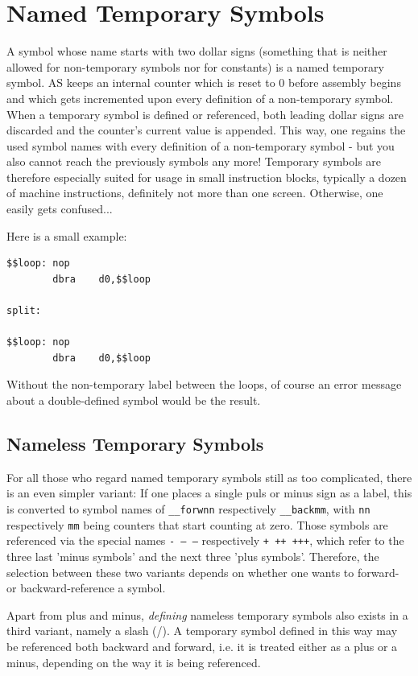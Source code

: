 \documentclass[12pt,twoside]{report}
\newcommand{\asname}{{AS}}
\begin{document}
\section{Named Temporary Symbols}

A symbol whose name starts with two dollar signs (something that is
neither allowed for non-temporary symbols nor for constants) is a named
temporary symbol.  \asname{} keeps an internal counter which is reset to 0 before
assembly begins and which gets incremented upon every definition of a
non-temporary symbol.  When a temporary symbol is defined or referenced,
both leading dollar signs are discarded and the counter's current value is
appended.  This way, one regains the used symbol names with every
definition of a non-temporary symbol - but you also cannot reach the
previously symbols any more! Temporary symbols are therefore especially
suited for usage in small instruction blocks, typically a dozen of machine
instructions, definitely not more than one screen.  Otherwise, one easily
gets confused...

Here is a small example:
\begin{verbatim}
$$loop: nop
        dbra    d0,$$loop

split:

$$loop: nop
        dbra    d0,$$loop
\end{verbatim}
Without the non-temporary label between the loops, of course an error
message about a double-defined symbol would be the result.

\subsection{Nameless Temporary Symbols}

For all those who regard named temporary symbols still as too complicated,
there is an even simpler variant: If one places a single puls or minus
sign as a label, this is converted to symbol names of {\tt \_\_forwnn}
respectively {\tt \_\_backmm}, with {\tt nn} respectively {\tt mm} being
counters that start counting at zero.  Those symbols are referenced via
the special names {\tt - -- ---} respectively {\tt + ++ +++}, which refer
to the three last 'minus symbols' and the next three 'plus symbols'.
Therefore, the selection between these two variants depends on whether one
wants to forward- or backward-reference a symbol.

Apart from plus and minus, {\em defining} nameless temporary symbols also
exists in a third variant, namely a slash (/).  A temporary symbol defined
in this way may be referenced both backward and forward, i.e. it is
treated either as a plus or a minus, depending on the way it is being
referenced.
\end{document}
